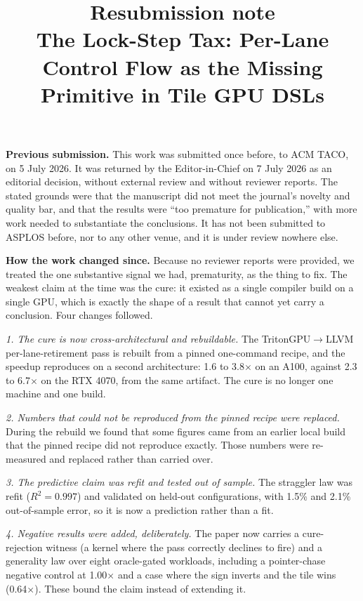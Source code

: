 \documentclass[10pt]{article}
\title{\vspace{-2.5em}Resubmission note\\
\large The Lock-Step Tax: Per-Lane Control Flow as the Missing Primitive in Tile GPU DSLs}
\date{}
\author{}
\begin{document}
\maketitle
\vspace{-3em}

\textbf{Previous submission.} This work was submitted once before, to ACM TACO, on
5 July 2026. It was returned by the Editor-in-Chief on 7 July 2026 as an editorial
decision, without external review and without reviewer reports. The stated grounds
were that the manuscript did not meet the journal's novelty and quality bar, and
that the results were ``too premature for publication,'' with more work needed to
substantiate the conclusions. It has not been submitted to ASPLOS before, nor to
any other venue, and it is under review nowhere else.

\textbf{How the work changed since.} Because no reviewer reports were provided, we
treated the one substantive signal we had, prematurity, as the thing to fix. The
weakest claim at the time was the cure: it existed as a single compiler build on a
single GPU, which is exactly the shape of a result that cannot yet carry a
conclusion. Four changes followed.

\emph{1. The cure is now cross-architectural and rebuildable.} The
TritonGPU$\rightarrow$LLVM per-lane-retirement pass is rebuilt from a pinned
one-command recipe, and the speedup reproduces on a second architecture: 1.6 to
3.8$\times$ on an A100, against 2.3 to 6.7$\times$ on the RTX 4070, from the same
artifact. The cure is no longer one machine and one build.

\emph{2. Numbers that could not be reproduced from the pinned recipe were
replaced.} During the rebuild we found that some figures came from an earlier local
build that the pinned recipe did not reproduce exactly. Those numbers were
re-measured and replaced rather than carried over.

\emph{3. The predictive claim was refit and tested out of sample.} The straggler law
was refit ($R^2 = 0.997$) and validated on held-out configurations, with 1.5\% and
2.1\% out-of-sample error, so it is now a prediction rather than a fit.

\emph{4. Negative results were added, deliberately.} The paper now carries a
cure-rejection witness (a kernel where the pass correctly declines to fire) and a
generality law over eight oracle-gated workloads, including a pointer-chase negative
control at 1.00$\times$ and a case where the sign inverts and the tile wins
(0.64$\times$). These bound the claim instead of extending it.
\end{document}
